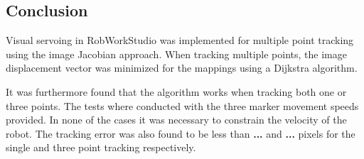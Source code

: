 \subsection{Conclusion}
Visual servoing in RobWorkStudio was implemented for multiple point tracking using the image Jacobian approach.
When tracking multiple points, the image displacement vector was minimized for the mappings using a Dijkstra algorithm.

It was furthermore found that the algorithm works when tracking both one or three points.
The tests where conducted with the three marker movement speeds provided.
In none of the cases it was necessary to constrain the velocity of the robot.
The tracking error was also found to be less than \textbf{...} and \textbf{...} pixels for the single and three point tracking respectively.